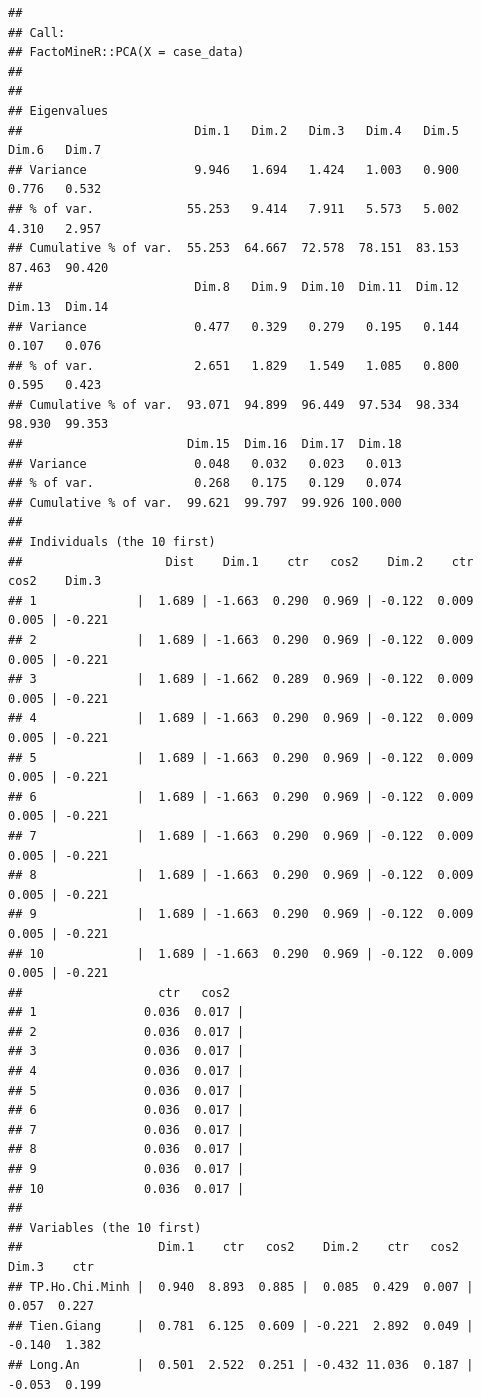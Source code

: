 \documentclass[../thesis.tex]{subfiles}
\begin{document}
\begin{verbatim}
##
## Call:
## FactoMineR::PCA(X = case_data) 
## 
## 
## Eigenvalues
##                        Dim.1   Dim.2   Dim.3   Dim.4   Dim.5   Dim.6   Dim.7
## Variance               9.946   1.694   1.424   1.003   0.900   0.776   0.532
## % of var.             55.253   9.414   7.911   5.573   5.002   4.310   2.957
## Cumulative % of var.  55.253  64.667  72.578  78.151  83.153  87.463  90.420
##                        Dim.8   Dim.9  Dim.10  Dim.11  Dim.12  Dim.13  Dim.14
## Variance               0.477   0.329   0.279   0.195   0.144   0.107   0.076
## % of var.              2.651   1.829   1.549   1.085   0.800   0.595   0.423
## Cumulative % of var.  93.071  94.899  96.449  97.534  98.334  98.930  99.353
##                       Dim.15  Dim.16  Dim.17  Dim.18
## Variance               0.048   0.032   0.023   0.013
## % of var.              0.268   0.175   0.129   0.074
## Cumulative % of var.  99.621  99.797  99.926 100.000
## 
## Individuals (the 10 first)
##                    Dist    Dim.1    ctr   cos2    Dim.2    ctr   cos2    Dim.3
## 1              |  1.689 | -1.663  0.290  0.969 | -0.122  0.009  0.005 | -0.221
## 2              |  1.689 | -1.663  0.290  0.969 | -0.122  0.009  0.005 | -0.221
## 3              |  1.689 | -1.662  0.289  0.969 | -0.122  0.009  0.005 | -0.221
## 4              |  1.689 | -1.663  0.290  0.969 | -0.122  0.009  0.005 | -0.221
## 5              |  1.689 | -1.663  0.290  0.969 | -0.122  0.009  0.005 | -0.221
## 6              |  1.689 | -1.663  0.290  0.969 | -0.122  0.009  0.005 | -0.221
## 7              |  1.689 | -1.663  0.290  0.969 | -0.122  0.009  0.005 | -0.221
## 8              |  1.689 | -1.663  0.290  0.969 | -0.122  0.009  0.005 | -0.221
## 9              |  1.689 | -1.663  0.290  0.969 | -0.122  0.009  0.005 | -0.221
## 10             |  1.689 | -1.663  0.290  0.969 | -0.122  0.009  0.005 | -0.221
##                   ctr   cos2  
## 1               0.036  0.017 |
## 2               0.036  0.017 |
## 3               0.036  0.017 |
## 4               0.036  0.017 |
## 5               0.036  0.017 |
## 6               0.036  0.017 |
## 7               0.036  0.017 |
## 8               0.036  0.017 |
## 9               0.036  0.017 |
## 10              0.036  0.017 |
## 
## Variables (the 10 first)
##                   Dim.1    ctr   cos2    Dim.2    ctr   cos2    Dim.3    ctr
## TP.Ho.Chi.Minh |  0.940  8.893  0.885 |  0.085  0.429  0.007 |  0.057  0.227
## Tien.Giang     |  0.781  6.125  0.609 | -0.221  2.892  0.049 | -0.140  1.382
## Long.An        |  0.501  2.522  0.251 | -0.432 11.036  0.187 | -0.053  0.199

\end{verbatim}
\end{document}

